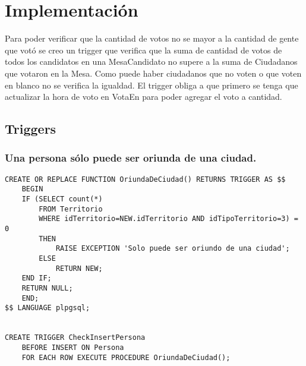 \section{Implementación}


Para poder verificar que la cantidad de votos no se mayor a la cantidad de gente que votó se creo un trigger que verifica que la suma de  cantidad de votos de todos los  candidatos en una MesaCandidato no supere a la suma de Ciudadanos que votaron en la Mesa. Como puede haber ciudadanos que no voten o que voten en blanco no se verifica la igualdad. 
    El trigger obliga  a que primero se tenga que actualizar la hora de voto en VotaEn para poder agregar el voto a cantidad. 

\subsection{Triggers}

\subsubsection{Una persona sólo puede ser oriunda de una ciudad.}

\begin{verbatim}
CREATE OR REPLACE FUNCTION OriundaDeCiudad() RETURNS TRIGGER AS $$
    BEGIN
    IF (SELECT count(*) 
        FROM Territorio 
        WHERE idTerritorio=NEW.idTerritorio AND idTipoTerritorio=3) = 0 
        THEN
            RAISE EXCEPTION 'Solo puede ser oriundo de una ciudad';              
        ELSE
            RETURN NEW;
    END IF;
    RETURN NULL;
    END;
$$ LANGUAGE plpgsql;


CREATE TRIGGER CheckInsertPersona
    BEFORE INSERT ON Persona
    FOR EACH ROW EXECUTE PROCEDURE OriundaDeCiudad();

\end{verbatim}

